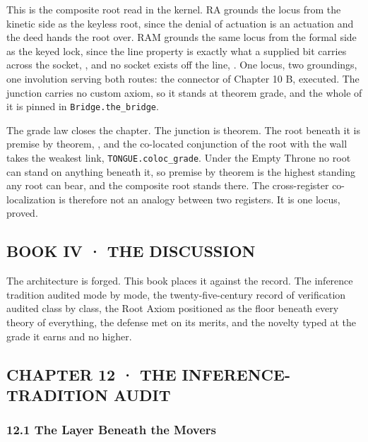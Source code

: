 \documentclass[10pt,twocolumn]{article}
\begin{document}
This is the composite root read in the kernel. RA grounds the locus from
the kinetic side as the keyless root, since the denial of actuation is
an actuation and the deed hands the root over. RAM grounds the same
locus from the formal side as the keyed lock, since the line property is
exactly what a supplied bit carries across the socket,
\texttt{}, and no socket
exists off the line, \texttt{}.
One locus, two groundings, one involution serving both routes: the
connector of Chapter 10 B, executed. The junction carries no custom
axiom, so it stands at theorem grade, and the whole of it is pinned in
\texttt{Bridge.the\_bridge}.

The grade law closes the chapter. The junction is theorem. The root
beneath it is premise by theorem,
\texttt{}, and the co-located
conjunction of the root with the wall takes the weakest link,
\texttt{TONGUE.coloc\_grade}. Under the Empty Throne no root can stand
on anything beneath it, so premise by theorem is the highest standing
any root can bear, and the composite root stands there. The
cross-register co-localization is therefore not an analogy between two
registers. It is one locus, proved.

\hypertarget{book-iv-the-discussion}{%
\subsection{BOOK IV · THE DISCUSSION}\label{book-iv-the-discussion}}

The architecture is forged. This book places it against the record. The
inference tradition audited mode by mode, the twenty-five-century record
of verification audited class by class, the Root Axiom positioned as the
floor beneath every theory of everything, the defense met on its merits,
and the novelty typed at the grade it earns and no higher.

\hypertarget{chapter-12-the-inference-tradition-audit}{%
\subsection{CHAPTER 12 · THE INFERENCE-TRADITION
AUDIT}\label{chapter-12-the-inference-tradition-audit}}

\hypertarget{the-layer-beneath-the-movers}{%
\subsubsection{12.1 The Layer Beneath the
Movers}\label{the-layer-beneath-the-movers}}
\end{document}
